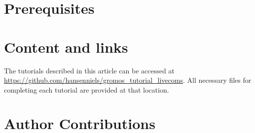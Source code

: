 \documentclass[9pt,tutorial,pubversion]{../includes/livecoms}
\begin{document}



\section{Prerequisites}




\section{Content and links}

The tutorials described in this article can be accessed at \url{https://github.com/hansenniels/gromos_tutorial_livecoms}. All necessary files for completing each tutorial are provided at that location.

%














\section{Author Contributions}
%
\end{document}
